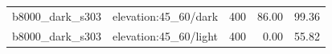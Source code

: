 \begin{longtable}{l>{\raggedright\arraybackslash}p{.42\linewidth}rrr}
b8000\_\allowbreak{}dark\_\allowbreak{}s303 & %
elevation:45\_\allowbreak{}60/dark & %
400 & %
86.00 & %
99.36 \\ %

b8000\_\allowbreak{}dark\_\allowbreak{}s303 & %
elevation:45\_\allowbreak{}60/light & %
400 & %
0.00 & %
55.82 \\ %


\end{longtable}

